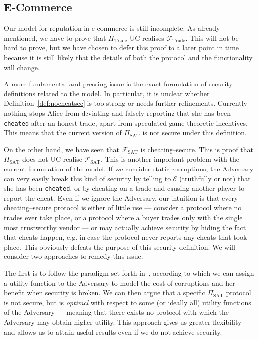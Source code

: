 \subsection{E-Commerce}
  Our model for reputation in e-commerce is still incomplete. As already mentioned, we
  have to prove that $\Pi_{\mathrm{Trade}}$ UC-realises $\mathcal{F}_{\mathrm{Trade}}$.
  This will not be hard to prove, but we have chosen to defer this proof to a later point
  in time because it is still likely that the details of both the protocol and the
  functionality will change.

  A more fundamental and pressing issue is the exact formulation of security definitions
  related to the model. In particular, it is unclear whether
  Definition~\ref{def:nocheatsec} is too strong or needs further refinements. Currently
  nothing stops Alice from deviating and falsely reporting that she has been
  \texttt{cheated} after an honest trade, apart from speculated game-theoretic incentives.
  This means that the current version of $\Pi_{\mathrm{SAT}}$ is not secure under this
  definition.

  On the other hand, we have seen that $\mathcal{F}_{\mathrm{SAT}}$ is cheating--secure.
  This is proof that $\Pi_{\mathrm{SAT}}$ does not UC-realise
  $\mathcal{F}_{\mathrm{SAT}}$. This is another important problem with the current
  formulation of the model. If we consider static corruptions, the Adversary can very
  easily break this kind of security by telling to $\mathcal{E}$ (truthfully or not) that
  she has been \texttt{cheated}, or by cheating on a trade and causing another player to
  report the cheat. Even if we ignore the Adversary, our intuition is that every
  cheating--secure protocol is either of little use --- consider a protocol where no
  trades ever take place, or a protocol where a buyer trades only with the single most
  trustworthy vendor --- or may actually achieve security by hiding the fact that cheats
  happen, e.g. in case the protocol never reports any cheats that took place. This
  obviously defeats the purpose of this security definition. We will consider two
  approaches to remedy this issue.

  The first is to follow the paradigm set forth in~\cite{rationalprotocol}, according to
  which we can assign a utility function to the Adversary to model the cost of corruptions
  and her benefit when security is broken. We can then argue that a specific
  $\Pi_{\mathrm{SAT}}$ protocol is not secure, but is \textit{optimal} with respect to
  some (or ideally all) utility functions of the Adversary --- meaning that there exists
  no protocol with which the Adversary may obtain higher utility. This approach gives us
  greater flexibility and allows us to attain useful results even if we do not achieve
  security.
